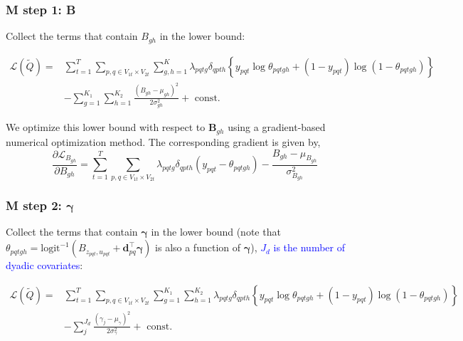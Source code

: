 \documentclass{article}
\begin{document}
\subsubsection{M step 1: B}

Collect the terms that contain $B_{gh}$ in the lower bound:

\begin{equation*}
\begin{aligned} \mathcal{L}(\widetilde{Q})=& \sum_{t=1}^{T} \sum_{p, q \in V_{1t} \times V_{2t}} \sum_{g, h=1}^{K} \lambda_{p q t g} \delta_{q p t h}\left\{y_{p q t} \log \theta_{p q t g h}+\left(1-y_{p q t}\right) \log \left(1-\theta_{p q t g h}\right)\right\} \\ &-\sum_{g=1}^{K_1} \sum_{h=1}^{K_2} \frac{\left(B_{g h}-\mu_{g h}\right)^{2}}{2 \sigma_{g h}^{2}}+\text { const. } \end{aligned}
\end{equation*}

We optimize this lower bound with respect to \(\mathbf{B}_{g h}\) using a gradient-based numerical optimization method. The corresponding gradient is given by,
$$
\frac{\partial \mathcal{L}_{B_{g h}}}{\partial B_{g h}}=\sum_{t=1}^{T} \sum_{p, q \in V_{1t} \times V_{2t}} \lambda_{p  q t g} \delta_{q p t h}\left(y_{p q t}-\theta_{p q t g h}\right)-\frac{B_{g h}-\mu_{B_{g h}}}{\sigma_{B_{g h}}^{2}}
$$
\subsubsection{M step 2: $\boldsymbol{\gamma}$}

Collect the terms that contain $\boldsymbol{\gamma}$ in the lower bound (note that $\theta_{pqtgh} = \mathrm{logit}^{-1} (B_{z_{pqt},u_{pqt}} + \mathbf{d}_{pq}^\top \boldsymbol{\gamma})$ is also a function of $\boldsymbol{\gamma}$), \textcolor{blue}{$J_{d}$ is the number of dyadic covariates}:

\begin{equation*}
\begin{aligned} \mathcal{L}(\tilde{Q})=& \sum_{t=1}^{T} \sum_{p, q \in V_{1t} \times V_{2t}} \sum_{g=1}^{K_1} \sum_{h=1}^{K_2} \lambda_{p q t g} \delta_{q p t h}\left\{y_{p q t} \log \theta_{p q t g h}+\left(1-y_{p q t}\right) \log \left(1-\theta_{p q t g h}\right)\right\} \\ &-\sum_{j}^{J_{d}} \frac{\left(\gamma_{j}-\mu_{\gamma}\right)^{2}}{2 \sigma_{\gamma}^{2}}+\text { const. } \end{aligned}
\end{equation*}
\end{document}
